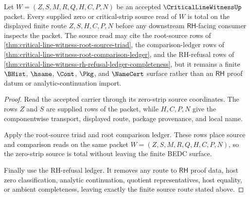 \begin{theorem}
\label{thm:critical-line-witness-zero-strip-source-totality}
Let $W=(Z,S,M,R,Q,H,C,P,N)$ be an accepted $\CriticalLineWitnessUp$ packet. Every supplied zero or critical-strip source read of $W$ is total on the displayed finite route $Z,S,H,C,P,N$ before any downstream $\mathsf{RH}$-facing consumer inspects the packet. The source read may cite the root-source rows of \autoref{thm:critical-line-witness-root-source-triad}, the comparison-ledger rows of \autoref{thm:critical-line-witness-root-comparison-ledger}, and the RH-refusal rows of \autoref{thm:critical-line-witness-rh-refusal-ledger-completeness}, but it remains a finite $\BHist$, $\hsame$, $\Cont$, $\Pkg$, and $\NameCert$ surface rather than an $\mathsf{RH}$ proof datum or analytic-continuation import.
\end{theorem}
\begin{proof}
Read the accepted carrier through its zero-strip source coordinates. The rows $Z$ and $S$ are supplied rows of the packet, while $H,C,P,N$ give the componentwise transport, displayed route, package provenance, and local name.

Apply the root-source triad and root comparison ledger. These rows place source and comparison reads on the same packet $W=(Z,S,M,R,Q,H,C,P,N)$, so the zero-strip source is total without leaving the finite BEDC surface.

Finally use the RH-refusal ledger. It removes any route to $\mathsf{RH}$ proof data, host zero classification, analytic continuation, quotient representatives, host equality, or ambient completeness, leaving exactly the finite source route stated above.
\end{proof}

